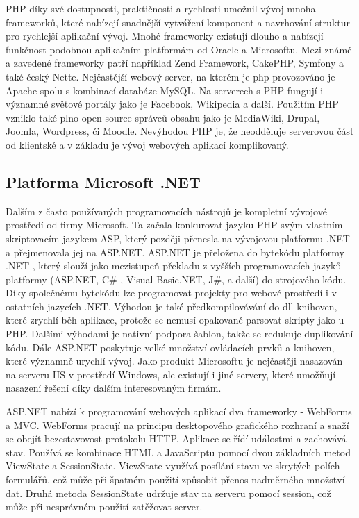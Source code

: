 \documentclass[11pt,twoside,a4paper]{book}
\begin{document}
PHP díky své dostupnosti, praktičnosti a rychlosti umožnil vývoj mnoha frameworků, které nabízejí snadnější vytváření komponent a navrhování struktur pro rychlejší aplikační vývoj. Mnohé frameworky existují dlouho a nabízejí funkčnost podobnou aplikačním platformám od Oracle a Microsoftu. Mezi známé a zavedené frameworky patří například Zend Framework, CakePHP, Symfony a také český Nette. Nejčastější webový server, na kterém je php provozováno je Apache spolu s kombinací databáze MySQL. Na serverech s PHP fungují i významné světové portály jako je Facebook, Wikipedia a další. Použitím PHP vzniklo také plno open source správců obsahu jako je MediaWiki, Drupal, Joomla, Wordpress, či Moodle. Nevýhodou PHP je, že neodděluje serverovou část od klientské a v základu je vývoj webových aplikací komplikovaný. \cite{wiki:frameworks}
 

\subsection{Platforma Microsoft .NET}
\label{asp.net}
Dalším z často používaných programovacích nástrojů je kompletní vývojové prostředí od firmy Microsoft. Ta začala konkurovat jazyku PHP svým vlastním skriptovacím jazykem ASP, který později přenesla na vývojovou platformu .NET a přejmenovala jej na ASP.NET. ASP.NET  je přeložena do bytekódu platformy .NET , který slouží jako mezistupeň překladu z vyšších programovacích jazyků platformy (ASP.NET, C\# , Visual Basic.NET, J\#, a další) do strojového kódu\cite{netframework}.  Díky společnému bytekódu lze programovat projekty pro webové prostředí i v ostatních jazycích .NET. Výhodou je také předkompilovávání do dll knihoven, které zrychlí běh aplikace, protože se nemusí opakovaně parsovat skripty jako u PHP. Dalšími výhodami je nativní podpora šablon, takže se redukuje duplikování kódu. Dále ASP.NET poskytuje velké množství ovládacích prvků a knihoven, které významně urychlí vývoj. Jako produkt Microsoftu je nejčastěji nasazován na serveru IIS v prostředí Windows, ale existují i jiné servery, které umožňují nasazení řešení díky dalším interesovaným firmám.\cite{aspnet}

ASP.NET nabízí k programování webových aplikací dva frameworky - WebForms a MVC. 
WebForms pracují na principu desktopového grafického rozhraní a snaží se obejít bezestavovost protokolu HTTP. Aplikace se řídí událostmi a  zachovává stav. Používá se kombinace HTML a JavaScriptu pomocí dvou základních metod ViewState a SessionState. ViewState využívá posílání stavu ve skrytých polích formulářů, což může při špatném použití způsobit přenos nadměrného množství dat. Druhá metoda SessionState udržuje stav na serveru pomocí session, což může při nesprávném použití zatěžovat server.
\end{document}
